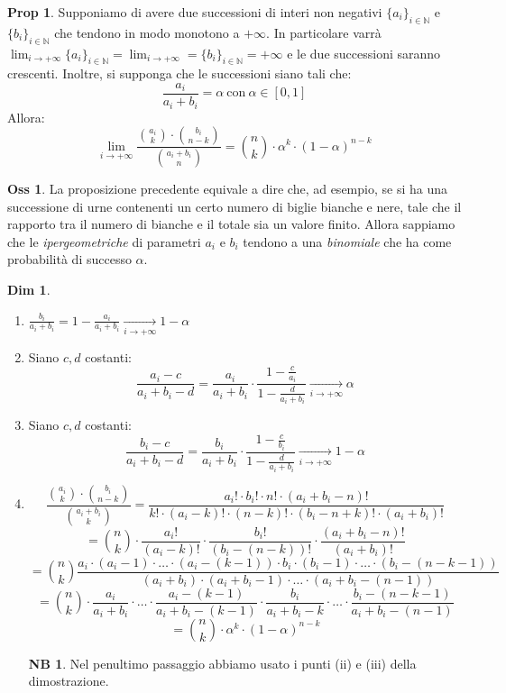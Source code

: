 \documentclass[12pt, a4paper]{report}
\theoremstyle{definition}
\newtheorem*{demonstration}{Dim}
\newtheorem*{proposition}{Prop}
\newtheorem*{observation}{Oss}
\newtheorem*{note}{NB}
\DeclareRobustCommand{\N}{\mathbb{N}}%
\begin{document}
\begin{proposition}
	Supponiamo di avere due successioni di interi non negativi \(\{a_i\}_{i\in\N}\) e
	\(\{b_i\}_{i\in\N}\) che tendono in modo monotono a $+\infty$. In particolare
	varrà \(\lim_{i\rightarrow +\infty}\{a_i\}_{i\in\N}=\lim_{i\rightarrow +\infty}
	=\{b_i\}_{i\in\N}=+\infty\) e le due successioni saranno crescenti. Inoltre,
	si supponga che le successioni siano tali che:
	\[\frac{a_i}{a_i+b_i}=\alpha\ \text{con}\ \alpha\in[0,1 ]\]
	Allora:
	\[\lim_{i\rightarrow +\infty}\frac{\binom{a_i}{k}\cdot \binom{b_i}{n-k}}{\binom
	{a_i+b_i}{n}}=\binom{n}{k}\cdot \alpha^k\cdot (1-\alpha)^{n-k}\]
\end{proposition}
\begin{observation}
	La proposizione precedente equivale a dire che, ad esempio, se si ha una
	successione di urne contenenti un certo numero di biglie bianche e nere, tale
	che il rapporto tra il numero di bianche e il totale sia un valore finito.
	Allora sappiamo che le \emph{ipergeometriche} di parametri $a_i$ e $b_i$
	tendono a una \emph{binomiale} che ha come probabilità di successo $\alpha$.
\end{observation}

\begin{demonstration}
	\mbox{}
	\begin{enumerate}[label=(\roman*)]
		\item \(\frac{b_i}{a_i+b_i}=1-\frac{a_i}{a_i+b_i}\xrightarrow[i\rightarrow
		+\infty]{}1-\alpha\)
		\item Siano $c,d$ costanti:
		\[\frac{a_i-c}{a_i+b_i-d}=\frac{a_i}{a_i+b_i}\cdot \frac{1-\frac{c}{a_i}}
		{1-\frac{d}{a_i+b_i}}\xrightarrow[i\rightarrow+\infty]{}\alpha\]
		\item Siano $c,d$ costanti:
		\[\frac{b_i-c}{a_i+b_i-d}=\frac{b_i}{a_i+b_i}\cdot \frac{1-\frac{c}{b_i}}
		{1-\frac{d}{a_i+b_i}}\xrightarrow[i\rightarrow+\infty]{}1-\alpha\]
		\item \[\frac{\binom{a_i}{k}\cdot \binom{b_i}{n-k}}{\binom{a_i+b_i}{k}}=
		\frac{a_i!\cdot b_i!\cdot n!\cdot (a_i+b_i-n)!}{k!\cdot (a_i-k)!\cdot (n-k)!\cdot (b_i-n+k)!\cdot (a_i+b_i)!}\]
		\[=\binom{n}{k}\cdot \frac{a_i!}{(a_i-k)!}\cdot \frac{b_i!}{(b_i-(n-k))!}\cdot \frac
		{(a_i+b_i-n)!}{(a_i+b_i)!}\]
		\[=\binom{n}{k}\frac{a_i\cdot (a_i-1)\cdot \dots\cdot (a_i-(k-1))\cdot b_i\cdot (b_i-1)\cdot \dots\cdot (b_i-(n-k-1))}
		{(a_i+b_i)\cdot (a_i+b_i-1)\cdot \dots\cdot (a_i+b_i-(n-1))}\]
		\[=\binom{n}{k}\cdot \frac{a_i}{a_i+b_i}\cdot \dots\cdot \frac{a_i-(k-1)}{a_i+b_i-(k-1)}
		\cdot \frac{b_i}{a_i+b_i-k}\cdot \dots\cdot \frac{b_i-(n-k-1)}{a_i+b_i-(n-1)}\]
		\[=\binom{n}{k}\cdot \alpha^k\cdot (1-\alpha)^{n-k}\]
		\begin{note}
			Nel penultimo passaggio abbiamo usato i punti (ii) e (iii) della
			dimostrazione.
		\end{note}
	\end{enumerate}
\end{demonstration}
\end{document}

